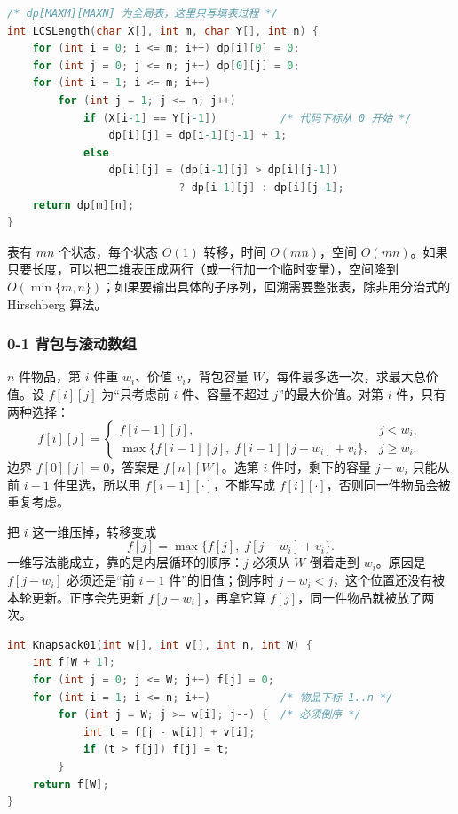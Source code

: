\begin{lstlisting}[language=C]
/* dp[MAXM][MAXN] 为全局表，这里只写填表过程 */
int LCSLength(char X[], int m, char Y[], int n) {
    for (int i = 0; i <= m; i++) dp[i][0] = 0;
    for (int j = 0; j <= n; j++) dp[0][j] = 0;
    for (int i = 1; i <= m; i++)
        for (int j = 1; j <= n; j++)
            if (X[i-1] == Y[j-1])          /* 代码下标从 0 开始 */
                dp[i][j] = dp[i-1][j-1] + 1;
            else
                dp[i][j] = (dp[i-1][j] > dp[i][j-1])
                           ? dp[i-1][j] : dp[i][j-1];
    return dp[m][n];
}
\end{lstlisting}

表有 $mn$ 个状态，每个状态 $O(1)$ 转移，时间 $O(mn)$，空间 $O(mn)$。如果只要长度，可以把二维表压成两行（或一行加一个临时变量），空间降到 $O(\min\{m,n\})$；如果要输出具体的子序列，回溯需要整张表，除非用分治式的 Hirschberg 算法。

\subsubsection{0-1 背包与滚动数组}

$n$ 件物品，第 $i$ 件重 $w_i$、价值 $v_i$，背包容量 $W$，每件最多选一次，求最大总价值。设 $f[i][j]$ 为“只考虑前 $i$ 件、容量不超过 $j$”的最大价值。对第 $i$ 件，只有两种选择：
\[
f[i][j]=
\begin{cases}
f[i-1][j], & j<w_i,\\
\max\{f[i-1][j],\;f[i-1][j-w_i]+v_i\}, & j\ge w_i.
\end{cases}
\]
边界 $f[0][j]=0$，答案是 $f[n][W]$。选第 $i$ 件时，剩下的容量 $j-w_i$ 只能从前 $i-1$ 件里选，所以用 $f[i-1][\cdot]$，不能写成 $f[i][\cdot]$，否则同一件物品会被重复考虑。

把 $i$ 这一维压掉，转移变成
\[
f[j]=\max\{f[j],\;f[j-w_i]+v_i\}.
\]
一维写法能成立，靠的是内层循环的顺序：$j$ 必须从 $W$ 倒着走到 $w_i$。原因是 $f[j-w_i]$ 必须还是“前 $i-1$ 件”的旧值；倒序时 $j-w_i<j$，这个位置还没有被本轮更新。正序会先更新 $f[j-w_i]$，再拿它算 $f[j]$，同一件物品就被放了两次。

\begin{lstlisting}[language=C]
int Knapsack01(int w[], int v[], int n, int W) {
    int f[W + 1];
    for (int j = 0; j <= W; j++) f[j] = 0;
    for (int i = 1; i <= n; i++)           /* 物品下标 1..n */
        for (int j = W; j >= w[i]; j--) {  /* 必须倒序 */
            int t = f[j - w[i]] + v[i];
            if (t > f[j]) f[j] = t;
        }
    return f[W];
}
\end{lstlisting}

